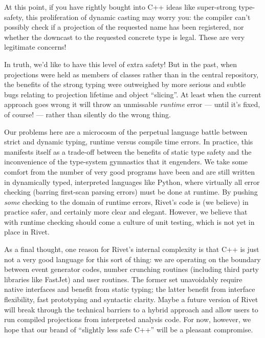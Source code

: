 \begin{philosophy}
  At this point, if you have rightly bought into C++ ideas like super-strong
  type-safety, this proliferation of dynamic casting may worry you: the compiler
  can't possibly check if a projection of the requested name has been
  registered, nor whether the downcast to the requested concrete type is
  legal. These are very legitimate concerns!

  In truth, we'd like to have this level of extra safety! But in the past, when
  projections were held as members of  classes rather
  than in the central  repository, the benefits of the
  strong typing were outweighed by more serious and subtle bugs relating to
  projection lifetime and object ``slicing''. At least when the current approach
  goes wrong it will throw an unmissable \emph{runtime} error --- until it's
  fixed, of course! --- rather than silently do the wrong thing.

  Our problems here are a microcosm of the perpetual language battle between
  strict and dynamic typing, runtime versus compile time errors. In practice,
  this manifests itself as a trade-off between the benefits of static type
  safety and the inconvenience of the type-system gymnastics that it engenders.
  We take some comfort from the number of very good programs have been and are
  still written in dynamically typed, interpreted languages like Python, where
  virtually all error checking (barring first-scan parsing errors) must be done
  at runtime. By pushing \emph{some} checking to the domain of runtime errors,
  Rivet's code is (we believe) in practice safer, and certainly more clear and
  elegant. However, we believe that with runtime checking should come a culture
  of unit testing, which is not yet in place in Rivet.

  As a final thought, one reason for Rivet's internal complexity is that C++ is
  just not a very good language for this sort of thing: we are operating on the
  boundary between event generator codes, number crunching routines (including
  third party libraries like FastJet) and user routines. The former set
  unavoidably require native interfaces and benefit from static typing; the
  latter benefit from interface flexibility, fast prototyping and syntactic
  clarity. Maybe a future version of Rivet will break through the technical
  barriers to a hybrid approach and allow users to run compiled projections from
  interpreted analysis code. For now, however, we hope that our brand of
  ``slightly less safe C++'' will be a pleasant compromise.
\end{philosophy}



